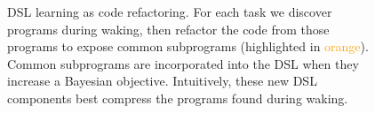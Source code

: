 \documentclass{article}
\newcommand{\orange}[1]{\textcolor{orange}{#1}}
\newcommand{\probability}{\mathds{P}} %
\begin{document}
\begin{figure}
\begin{tikzpicture}[every node/.style={inner sep=1,outer sep=0,rounded corners,thick}]
  \end{tikzpicture}
  \caption{DSL learning as code refactoring. For each task we discover programs during waking, then refactor the code from those programs to expose common subprograms (highlighted in \orange{orange}). Common subprograms are incorporated into the DSL when they increase a Bayesian objective. Intuitively, these new DSL components best compress the programs found during waking.}\label{mapFactor}
  \end{figure}

\end{document}
